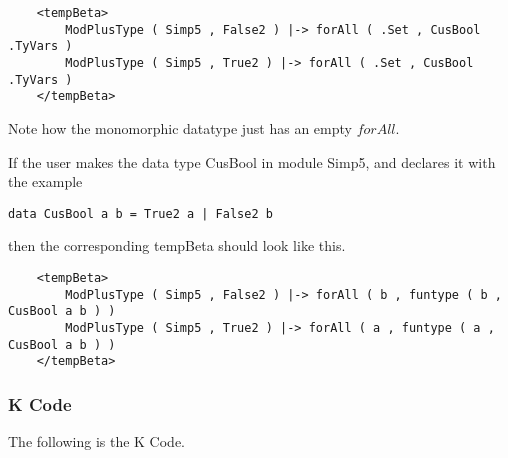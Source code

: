 \begin{lstlisting}
    <tempBeta>
        ModPlusType ( Simp5 , False2 ) |-> forAll ( .Set , CusBool .TyVars )
        ModPlusType ( Simp5 , True2 ) |-> forAll ( .Set , CusBool .TyVars )
    </tempBeta>
\end{lstlisting}

\noindent
Note how the monomorphic datatype just has an empty $forAll$.

If the user makes the data type CusBool in module Simp5, and declares it with the example
\begin{lstlisting}
data CusBool a b = True2 a | False2 b
\end{lstlisting}

\noindent
then the corresponding tempBeta should look like this.
\begin{lstlisting}
    <tempBeta>
        ModPlusType ( Simp5 , False2 ) |-> forAll ( b , funtype ( b , CusBool a b ) )
        ModPlusType ( Simp5 , True2 ) |-> forAll ( a , funtype ( a , CusBool a b ) )
    </tempBeta>

\end{lstlisting}

\subsubsection{K Code}
The following is the K Code.

